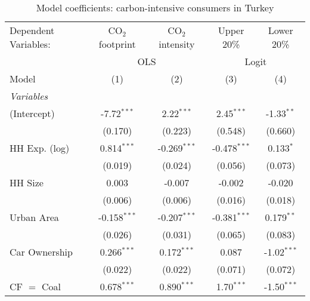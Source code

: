 
\begin{table}[htbp!]
   \centering
   \small
   \begin{adjustbox}{width = 1\textwidth, max height = 0.95\textheight, center}
      \begin{threeparttable}[b]
         \caption{\label{tab:Logit_1_TUR} Model coefficients: carbon-intensive consumers in Turkey}
         \begin{tabular}{lcccc}
            \tabularnewline \midrule \midrule
            Dependent Variables: & CO$_{2}$ footprint & CO$_{2}$ intensity & Upper 20\%     & Lower 20\%\\   
             & \multicolumn{2}{c}{OLS} & \multicolumn{2}{c}{Logit} \\ 
            Model                & (1)                & (2)                & (3)            & (4)\\  
            \midrule
            \emph{Variables}\\
            (Intercept)          & -7.72$^{***}$      & 2.22$^{***}$       & 2.45$^{***}$   & -1.33$^{**}$\\   
                                 & (0.170)            & (0.223)            & (0.548)        & (0.660)\\   
            HH Exp. (log)        & 0.814$^{***}$      & -0.269$^{***}$     & -0.478$^{***}$ & 0.133$^{*}$\\   
                                 & (0.019)            & (0.024)            & (0.056)        & (0.073)\\   
            HH Size              & 0.003              & -0.007             & -0.002         & -0.020\\   
                                 & (0.006)            & (0.006)            & (0.016)        & (0.018)\\   
            Urban Area           & -0.158$^{***}$     & -0.207$^{***}$     & -0.381$^{***}$ & 0.179$^{**}$\\   
                                 & (0.026)            & (0.031)            & (0.065)        & (0.083)\\   
            Car Ownership        & 0.266$^{***}$      & 0.172$^{***}$      & 0.087          & -1.02$^{***}$\\   
                                 & (0.022)            & (0.022)            & (0.071)        & (0.072)\\   
            CF $=$ Coal          & 0.678$^{***}$      & 0.890$^{***}$      & 1.70$^{***}$   & -1.50$^{***}$\\   

\end{tabular}
\end{threeparttable}
\end{adjustbox}
\end{table}
